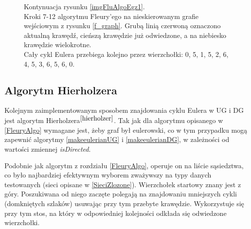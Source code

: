 \documentclass[a4paper, 12pt, twoside, openright]{article}
\begin{document}
\begin{figure}[p]
		\quad
		\quad
		
		\caption[]{Kontynuacja rysunku \ref{imgFluAlgoEgz1}.\\Kroki 7-12 algorytmu Fleury'ego na nieskierowanym grafie wejściowym z rysunku \ref{f_graph}. Grubą linią czerwoną oznaczono aktualną krawędź, cieńszą krawędzie już odwiedzone, a na niebiesko krawędzie wielokrotne. \\Cały  cykl Eulera przebiega kolejno przez wierzchołki: 0, 5, 1, 5, 2, 6, 4, 5, 3, 6, 5, 6, 0.}
		\label{imgFluAlgoEgz2}
	\end{figure}


\subsection{Algorytm Hierholzera}
\indent\par
	Kolejnym zaimplementowanym sposobem znajdowania cyklu Eulera w UG i DG jest algorytm Hierholzera$^{\cite{hierholzer}}$. Tak jak dla algorytmu opisanego w \ref{FleuryAlgo} wymagane jest, żeby graf był eulerowski, co w tym przypadku mogą zapewnić algorytmy \ref{makeeulerianUG} i \ref{makeeulerianDG}, w zależności od wartości zmiennej \textit{isDirected}.
	
	Podobnie jak algorytm z rozdziału \ref{FleuryAlgo}, operuje on na liście sąsiedztwa, co było najbardziej efektywnym wyborem zważywszy na typy danych testowanych (sieci opisane w \ref{SieciZlozone}). Wierzchołek startowy znany jest z góry. Poszukiwana od niego zaczęte polegają na znajdowaniu mniejszych cykli (domkniętych szlaków) usuwając przy tym przebyte krawędzie. Wykorzystuje się przy tym stos, na który w odpowiedniej kolejności odkłada się odwiedzone wierzchołki.
	
\end{document}
